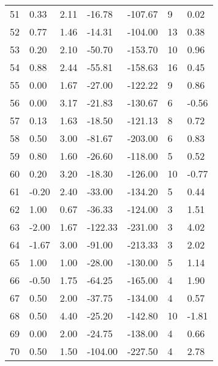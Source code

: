 \begin{appendices}
\begin{longtable}[c]{@{}lllllll@{}}
51 & 0.33 & 2.11 & -16.78 & -107.67 & 9 & 0.02 \\

52 & 0.77 & 1.46 & -14.31 & -104.00 & 13 & 0.38 \\

53 & 0.20 & 2.10 & -50.70 & -153.70 & 10 & 0.96 \\

54 & 0.88 & 2.44 & -55.81 & -158.63 & 16 & 0.45 \\

55 & 0.00 & 1.67 & -27.00 & -122.22 & 9 & 0.86 \\

56 & 0.00 & 3.17 & -21.83 & -130.67 & 6 & -0.56 \\

57 & 0.13 & 1.63 & -18.50 & -121.13 & 8 & 0.72 \\

58 & 0.50 & 3.00 & -81.67 & -203.00 & 6 & 0.83 \\

59 & 0.80 & 1.60 & -26.60 & -118.00 & 5 & 0.52 \\

60 & 0.20 & 3.20 & -18.30 & -126.00 & 10 & -0.77 \\

61 & -0.20 & 2.40 & -33.00 & -134.20 & 5 & 0.44 \\

62 & 1.00 & 0.67 & -36.33 & -124.00 & 3 & 1.51 \\

63 & -2.00 & 1.67 & -122.33 & -231.00 & 3 & 4.02 \\

64 & -1.67 & 3.00 & -91.00 & -213.33 & 3 & 2.02 \\

65 & 1.00 & 1.00 & -28.00 & -130.00 & 5 & 1.14 \\

66 & -0.50 & 1.75 & -64.25 & -165.00 & 4 & 1.90 \\

67 & 0.50 & 2.00 & -37.75 & -134.00 & 4 & 0.57 \\

68 & 0.50 & 4.40 & -25.20 & -142.80 & 10 & -1.81 \\

69 & 0.00 & 2.00 & -24.75 & -138.00 & 4 & 0.66 \\

70 & 0.50 & 1.50 & -104.00 & -227.50 & 4 & 2.78 \\


\end{longtable}
\end{appendices}

